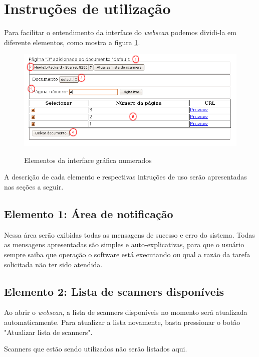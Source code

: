 \section{Instruções de utilização}
\label{sec:utilizacao}

Para facilitar o entendimento da interface do {\it webscan} podemos
dividi-la em diferente elementos, como mostra a figura \ref{fig:interface}.

\begin{figure}[ht]
\begin{center}
\scalebox{0.55} {
    \includegraphics{imagens/interface.png}}
\end{center}
  \caption{Elementos da interface gráfica numerados}
  \label{fig:interface}
\end{figure}

A descrição de cada elemento e respectivas intruções de uso
serão apresentadas nas seções a seguir.


\subsection{Elemento 1: Área de notificação}
Nessa área serão exibidas todas as mensagens de sucesso e
erro do sistema. Todas as mensagens apresentadas são simples 
e auto-explicativas, para que o usuário sempre saiba que 
operação o software está executando ou qual a razão da tarefa 
solicitada não ter sido atendida.

\subsection{Elemento 2: Lista de scanners disponíveis}
Ao abrir o {\it webscan}, a lista de scanners disponíveis no 
momento será atualizada automaticamente. Para atualizar a 
lista novamente, basta pressionar o botão "Atualizar lista 
de scanners".

Scanners que estão sendo utilizados não serão listados aqui. 

